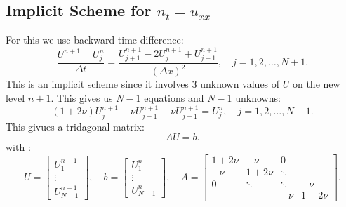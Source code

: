 \documentclass[../main/main.tex]{subfiles}
\begin{document}
\subsection{Implicit Scheme for $n_t = u_{ x x}$}
For this we use backward time difference: \[
    \frac{U^{n+1}-U^n_j}{\Delta t} = \frac{U^{n+1}_{j+1}-2U^{n+1}_j + U^{n+1}_{j-1}}{(\Delta x)^2}, \quad j = 1,2, \ldots,N+1
.\] This is an implicit scheme since it involves 3 unknown values of $U$ on the new level $n+1$. This gives us $N-1$ equations and $N-1$ unknowns: \[
(1+2\nu) U^{n+1}_j - \nu U^{n+1}_{j+1} - \nu U^{n+1}_{j-1} = U^n_j, \quad j = 1,2,\ldots, N-1
.\] This givues a tridagonal matrix: \[
AU = b
.\] with : \[
U = \begin{bmatrix} U_1^{n+1}\\ \vdots\\ U^{n+1}_{N-1} \end{bmatrix}, \quad b = \begin{bmatrix} U^n_1 \\ \vdots \\ U^n_{N-1} \end{bmatrix} , \quad A = \begin{bmatrix} 1+2\nu & - \nu &0 & \\ -\nu & 1+2\nu  & \ddots & \\ 0 &\ddots & \ddots& -\nu \\ & & -\nu & 1+ 2\nu \end{bmatrix} 
.\] 
\end{document}
